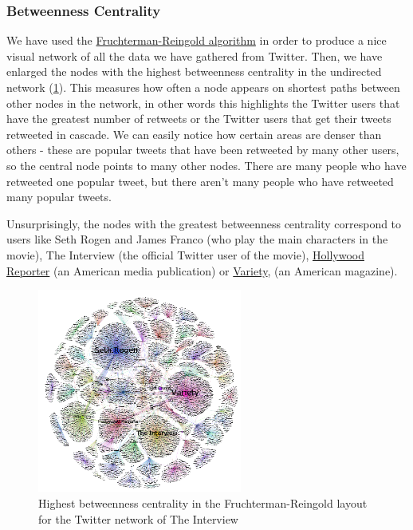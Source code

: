 \documentclass{llncs}
\begin{document}
\subsubsection{Betweenness Centrality}
We have used the
\href{https://github.com/gephi/gephi/wiki/Fruchterman-Reingold}{Fruchterman-Reingold
algorithm} in order to produce a nice visual network of all the data we have
gathered from Twitter. Then, we have enlarged the nodes with the highest
betweenness centrality in the undirected network
(\ref{fig:interview-twitter-betweennes-centrality}). This measures how often a
node appears on shortest paths between other nodes in the network, in other
words this highlights the Twitter users that have the greatest number of
retweets or the Twitter users that get their tweets retweeted in cascade. We can
easily notice how certain areas are denser than others - these are popular
tweets that have been retweeted by many other users, so the central node points
to many other nodes. There are many people who have retweeted one popular tweet,
but there aren't many people who have retweeted many popular tweets.

Unsurprisingly, the nodes with the greatest betweenness centrality correspond to
users like Seth Rogen and James Franco (who play the main characters in the
movie), The Interview (the official Twitter user of the movie),
\href{http://www.hollywoodreporter.com/}{Hollywood Reporter} (an American media
publication) or \href{www.variety.com}{Variety}, (an American magazine).
%
\begin{figure}
\centering
\includegraphics[width=0.6\textwidth]{interview-twitter-betweennes-centrality.png}
\caption{Highest betweenness centrality in the Fruchterman-Reingold layout for
the Twitter network of The Interview
\label{fig:interview-twitter-betweennes-centrality}}
\end{figure}
%
\end{document}
